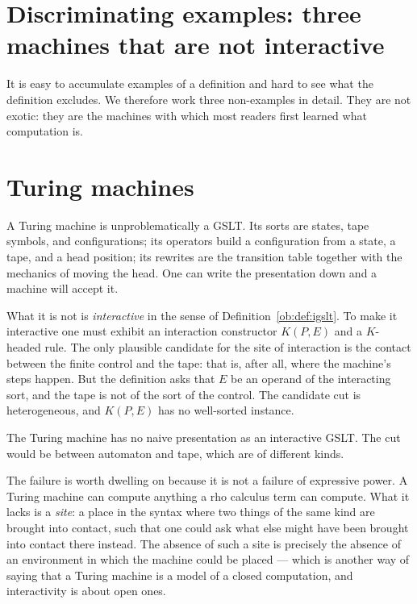 \section{Discriminating examples: three machines that are not interactive}
\label{ob:subsec:machines}

It is easy to accumulate examples of a definition and hard to see what the definition
excludes. We therefore work three non-examples in detail. They are not exotic: they are
the machines with which most readers first learned what computation is.

\section{Turing machines}

A Turing machine is unproblematically a GSLT. Its sorts are states, tape symbols, and
configurations; its operators build a configuration from a state, a tape, and a head
position; its rewrites are the transition table together with the mechanics of moving
the head. One can write the presentation down and a machine will accept it.

What it is not is \emph{interactive} in the sense of Definition~\ref{ob:def:igslt}. To make
it interactive one must exhibit an interaction constructor $K(P,E)$ and a $K$-headed
rule. The only plausible candidate for the site of interaction is the contact between
the finite control and the tape: that is, after all, where the machine's steps happen.
But the definition asks that $E$ be an operand of the interacting sort, and the tape is
not of the sort of the control. The candidate cut is heterogeneous, and $K(P,E)$ has no
well-sorted instance.

\begin{nonexample}
\label{ob:nonex:turing}
The Turing machine has no naive presentation as an interactive GSLT. The cut would be
between automaton and tape, which are of different kinds.
\end{nonexample}

The failure is worth dwelling on because it is not a failure of expressive power. A
Turing machine can compute anything a rho calculus term can compute. What it lacks is a
\emph{site}: a place in the syntax where two things of the same kind are brought into
contact, such that one could ask what else might have been brought into contact there
instead. The absence of such a site is precisely the absence of an environment in which
the machine could be placed --- which is another way of saying that a Turing machine is
a model of a closed computation, and interactivity is about open ones.

